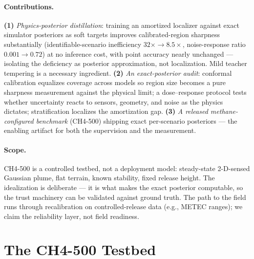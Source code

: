 \documentclass{article}
\begin{document}
\paragraph{Contributions.}
\textbf{(1)} \emph{Physics-posterior distillation}: training an amortized localizer against
exact simulator posteriors as soft targets improves calibrated-region sharpness
substantially (identifiable-scenario inefficiency $32\times \to 8.5\times$, noise-response
ratio $0.001 \to 0.72$) at no inference cost, with point accuracy nearly unchanged ---
isolating the deficiency as posterior approximation, not localization. Mild teacher
tempering is a necessary ingredient.
\textbf{(2)} \emph{An exact-posterior audit}: conformal calibration equalizes coverage
across models so region size becomes a pure sharpness measurement against the physical
limit; a dose--response protocol tests whether uncertainty reacts to sensors, geometry,
and noise as the physics dictates; stratification localizes the amortization gap.
\textbf{(3)} \emph{A released methane-configured benchmark} (CH4-500) shipping exact
per-scenario posteriors --- the enabling artifact for both the supervision and the
measurement.

\paragraph{Scope.} CH4-500 is a controlled testbed, not a deployment model: steady-state
2-D-sensed Gaussian plume, flat terrain, known stability, fixed release height. The
idealization is deliberate --- it is what makes the exact posterior computable, so the
trust machinery can be validated against ground truth. The path to the field runs through
recalibration on controlled-release data (e.g., METEC ranges); we claim the reliability
layer, not field readiness.

\section{The CH4-500 Testbed}
\label{sec:testbed}
\end{document}
